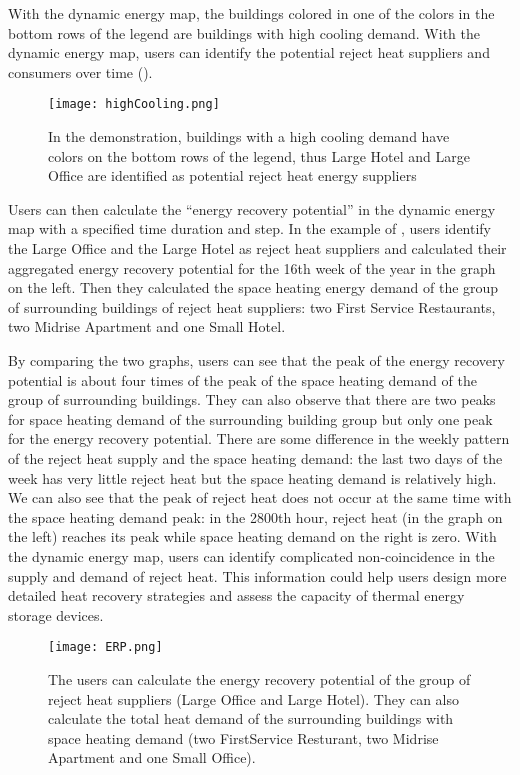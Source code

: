 With the dynamic energy map, the buildings colored in one of the
colors in the bottom rows of the legend are buildings with high
cooling demand. With the dynamic energy map, users can identify the
potential reject heat suppliers and consumers over time
().

\begin{figure}[h!]
  \centering
  \texttt{[image: highCooling.png]}
  \caption[Identify Buildings with High Cooling Demand]{In the
    demonstration, buildings with a high cooling demand have colors on
    the bottom rows of the legend, thus Large Hotel and Large Office
    are identified as potential reject heat energy suppliers}
  \label{fig:highCooling}
\end{figure}

Users can then calculate the ``energy recovery potential'' in the
dynamic energy map with a specified time duration and step.  In the
example of , users identify the Large Office and the
Large Hotel as reject heat suppliers and calculated their aggregated
energy recovery potential for the 16th week of the year in the graph
on the left. Then they calculated the space heating energy demand of
the group of surrounding buildings of reject heat suppliers: two First
Service Restaurants, two Midrise Apartment and one Small Hotel. 

By comparing the two graphs, users can see that the peak of the energy
recovery potential is about four times of the peak of the space
heating demand of the group of surrounding buildings. They can also
observe that there are two peaks for space heating demand of the
surrounding building group but only one peak for the energy recovery
potential. There are some difference in the weekly pattern of the
reject heat supply and the space heating demand: the last two days of
the week has very little reject heat but the space heating demand is
relatively high. We can also see that the peak of reject heat does not
occur at the same time with the space heating demand peak: in the
2800th hour, reject heat (in the graph on the left) reaches its peak
while space heating demand on the right is zero. With the dynamic
energy map, users can identify complicated non-coincidence in the
supply and demand of reject heat. This information could help users
design more detailed heat recovery strategies and assess the capacity
of thermal energy storage devices.

\begin{figure}[h!]
  \centering
  \texttt{[image: ERP.png]}
  \caption[Calculate Energy Recovery Potential]{The users can
    calculate the energy recovery potential of the group of reject
    heat suppliers (Large Office and Large Hotel). They can also
    calculate the total heat demand of the surrounding buildings with
    space heating demand (two FirstService Resturant, two Midrise
    Apartment and one Small Office).}
  \label{fig:ERP}
\end{figure}

